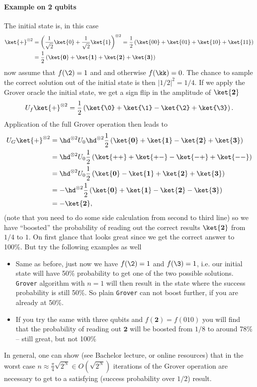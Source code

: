 \paragraph*{Example on 2 qubits}
The initial state is, in this case
\begin{align}
    \ket{+}^{\otimes 2} &= \left(\frac{1}{\sqrt{2}}\ket{0} + \frac{1}{\sqrt{2}}\ket{1}\right)^{\otimes 2} = \frac{1}{2}\left(\ket{00} + \ket{01} + \ket{10} + \ket{11}\right)\nonumber\\
    &= \frac{1}{2}\left(\ket{\mathbf{0}} + \ket{\mathbf{1}} + \ket{\mathbf{2}} + \ket{\mathbf{3}}\right)
\end{align}
now assume that $f(\2) = 1$ and and otherwise $f(\kk)=0$.
The chance to sample the correct solution out of the initial state is then $|1/2|^2=1/4$.
If we apply the Grover oracle the initial state, we get a sign flip in the amplitude of $\ket{\mathbf{2}}$
\begin{align}
    U_f \ket{+}^{\otimes 2} = \frac{1}{2}\left(\ket{\0} + \ket{\1} - \ket{\2} + \ket{\3}\right).
\end{align}
Application of the full Grover operation then leads to
\begin{align}
    U_G \ket{+}^{\otimes 2} &= \hd^{\otimes 2} U_0 \hd^{\otimes 2} \frac{1}{2}\left(\ket{\mathbf{0}} + \ket{\mathbf{1}} - \ket{\mathbf{2}} + \ket{\mathbf{3}}\right) \nonumber \\
    &= \hd^{\otimes 2} U_0  \frac{1}{2}\left(\ket{++} + \ket{+-} - \ket{-+} + \ket{--}\right) \nonumber \\
    &= \hd^{\otimes 2} U_0  \frac{1}{2}\left(\ket{\mathbf{0}} - \ket{\mathbf{1}} + \ket{\mathbf{2}} + \ket{\mathbf{3}}\right) \nonumber \\
    &= -\hd^{\otimes 2} \frac{1}{2}\left(\ket{\mathbf{0}} + \ket{\mathbf{1}} - \ket{\mathbf{2}} - \ket{\mathbf{3}}\right) \nonumber \\
    &= -\ket{\mathbf{2}},
\end{align}
(note that you need to do some side calculation from second to third line)
so we have ``boosted'' the probability of reading out the correct results $\ket{\mathbf{2}}$ from $1/4$ to $1$. On first glance that looks great since we get the correct answer to 100\%. But try the following examples as well
\begin{itemize}
    \item Same as before, just now we have $f(\2)=1$ and $f(\3)=1$, i.e. our initial state will have 50\% probability to get one of the two possible solutions. \texttt{Grover} algorithm with $n=1$ will then result in the state where the success probability is still 50\%. So plain \texttt{Grover} can not boost further, if you are already at 50\%. 
    \item If you try the same with three qubits and $f(\mathbf{2})=f(010)$ you will find that the probability of reading out $\mathbf{2}$ will be boosted from $1/8$ to around 78\% -- still great, but not 100\%
\end{itemize}
In general, one can show (see Bachelor lecture, or online resources) that in the worst case $n\approx \frac{\pi}{4}\sqrt{2^N} \in O(\sqrt{2^N})$ iterations of the Grover operation are necessary to get to a satisfying (success probability over $1/2$) result. 


